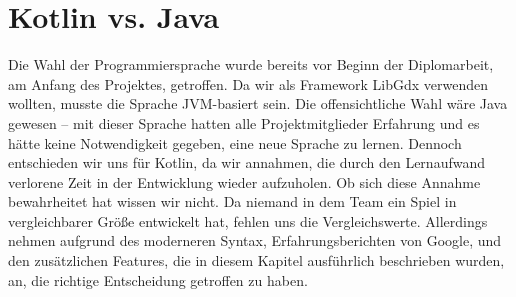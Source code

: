
\section{Kotlin vs. Java}\label{sec:kotlin-vs-java}

\renewcommand{\kapitelautor}{Autor: Marvin Kurka}

Die Wahl der Programmiersprache wurde bereits vor Beginn der Diplomarbeit, am Anfang des Projektes, getroffen.
Da wir als Framework LibGdx verwenden wollten, musste die Sprache JVM-basiert sein.
Die offensichtliche Wahl wäre Java gewesen -- mit dieser Sprache hatten alle Projektmitglieder Erfahrung und es hätte
keine Notwendigkeit gegeben, eine neue Sprache zu lernen.
Dennoch entschieden wir uns für Kotlin, da wir annahmen, die durch den Lernaufwand verlorene Zeit in der Entwicklung
wieder aufzuholen.
Ob sich diese Annahme bewahrheitet hat wissen wir nicht.
Da niemand in dem Team ein Spiel in vergleichbarer Größe entwickelt hat, fehlen uns die Vergleichswerte.
Allerdings nehmen aufgrund des moderneren Syntax, Erfahrungsberichten von \zB Google, und den zusätzlichen Features,
die in diesem Kapitel ausführlich beschrieben wurden, an, die richtige Entscheidung getroffen zu haben.

\renewcommand{\kapitelautor}{}
